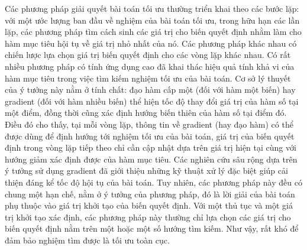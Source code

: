 \documentclass[../main.tex]{subfiles}
\begin{document}
Các phương pháp giải quyết bài toán tối ưu thường triển khai theo các bước lặp: với một ước lượng ban đầu về nghiệm của bài toán tối ưu, trong hữu hạn các lần lặp, các phương pháp tìm cách sinh các giá trị cho biến quyết định nhằm làm cho hàm mục tiêu hội tụ về giá trị nhỏ nhất của nó. Các phương pháp khác nhau có chiến lược lựa chọn giá trị biến quyết định cho các vòng lặp khác nhau. Có rất nhiều phương pháp có tính ứng dụng cao đã khai thác hiệu quả tính khả vi của hàm mục tiêu trong việc tìm kiếm nghiệm tối ưu của bài toán. Cơ sở lý thuyết của ý tưởng này nằm ở tính chất: đạo hàm cấp một (đối với hàm một biến) hay gradient (đối với hàm nhiều biến) thể hiện tốc độ thay đổi giá trị của hàm số tại một điểm, đồng thời cũng xác định hướng biến thiên của hàm số tại điểm đó. Điều đó cho thấy, tại mỗi vòng lặp, thông tin về gradient (hay đạo hàm) có thể được dùng để định hướng tới nghiệm tối ưu của bài toán, giá trị của biến quyết định trong vòng lặp tiếp theo chỉ cần cập nhật dựa trên giá trị hiện tại cùng với hướng giảm xác định được của hàm mục tiêu. Các nghiên cứu sâu rộng dựa trên ý tưởng sử dụng gradient đã giới thiệu những kỹ thuật xử lý đặc biệt giúp cải thiện đáng kể tốc độ hội tụ của bài toán. Tuy nhiên, các phương pháp này đều có chung một hạn chế, nằm ở ý tưởng của phương pháp, đó là lời giải của bài toán phụ thuộc vào giá trị khởi tạo của biến quyết định. Với một thủ tục và một giá trị khởi tạo xác định, các phương pháp này thường chỉ lựa chọn các giá trị cho biến quyết định nằm trên một hoặc một số hướng tìm kiếm. Như vậy, rất khó để đảm bảo nghiệm tìm được là tối ưu toàn cục. 
\end{document}
